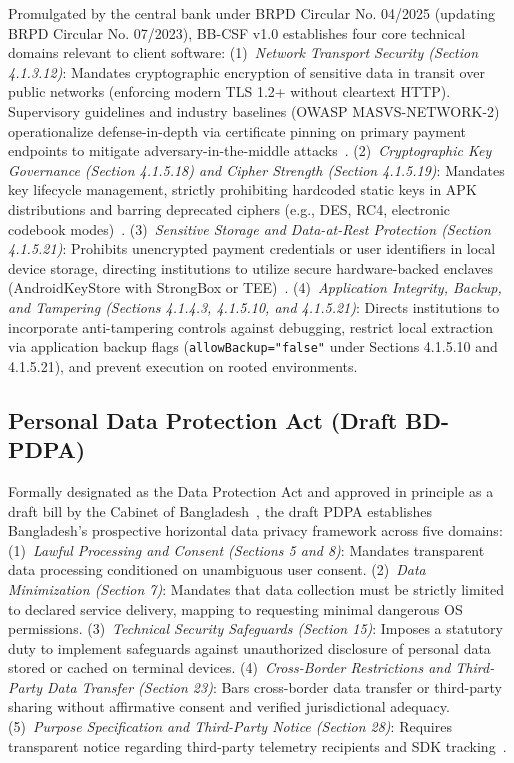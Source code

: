 Promulgated by the central bank under BRPD Circular No. 04/2025 (updating BRPD Circular No. 07/2023), BB-CSF v1.0 establishes four core technical domains relevant to client software:
(1)~\textit{Network Transport Security (Section 4.1.3.12)}: Mandates cryptographic encryption of sensitive data in transit over public networks (enforcing modern TLS 1.2+ without cleartext HTTP). Supervisory guidelines and industry baselines (OWASP MASVS-NETWORK-2) operationalize defense-in-depth via certificate pinning on primary payment endpoints to mitigate adversary-in-the-middle attacks~\cite{fahl_msc, castle_crypto}.
(2)~\textit{Cryptographic Key Governance (Section 4.1.5.18) and Cipher Strength (Section 4.1.5.19)}: Mandates key lifecycle management, strictly prohibiting hardcoded static keys in APK distributions and barring deprecated ciphers (e.g., DES, RC4, electronic codebook modes)~\cite{crypto_misuse_ccs}.
(3)~\textit{Sensitive Storage and Data-at-Rest Protection (Section 4.1.5.21)}: Prohibits unencrypted payment credentials or user identifiers in local device storage, directing institutions to utilize secure hardware-backed enclaves (AndroidKeyStore with StrongBox or TEE)~\cite{ekberg_tee}.
(4)~\textit{Application Integrity, Backup, and Tampering (Sections 4.1.4.3, 4.1.5.10, and 4.1.5.21)}: Directs institutions to incorporate anti-tampering controls against debugging, restrict local extraction via application backup flags (\texttt{allowBackup="false"} under Sections 4.1.5.10 and 4.1.5.21), and prevent execution on rooted environments.

\subsection{Personal Data Protection Act (Draft BD-PDPA)}
\label{sec:statutory:pdpa}

Formally designated as the Data Protection Act and approved in principle as a draft bill by the Cabinet of Bangladesh~\cite{bd_pdpa_2026}, the draft PDPA establishes Bangladesh's prospective horizontal data privacy framework across five domains:
(1)~\textit{Lawful Processing and Consent (Sections 5 and 8)}: Mandates transparent data processing conditioned on unambiguous user consent.
(2)~\textit{Data Minimization (Section 7)}: Mandates that data collection must be strictly limited to declared service delivery, mapping to requesting minimal dangerous OS permissions.
(3)~\textit{Technical Security Safeguards (Section 15)}: Imposes a statutory duty to implement safeguards against unauthorized disclosure of personal data stored or cached on terminal devices.
(4)~\textit{Cross-Border Restrictions and Third-Party Data Transfer (Section 23)}: Bars cross-border data transfer or third-party sharing without affirmative consent and verified jurisdictional adequacy.
(5)~\textit{Purpose Specification and Third-Party Notice (Section 28)}: Requires transparent notice regarding third-party telemetry recipients and SDK tracking~\cite{binns_third_party_trackers}.

